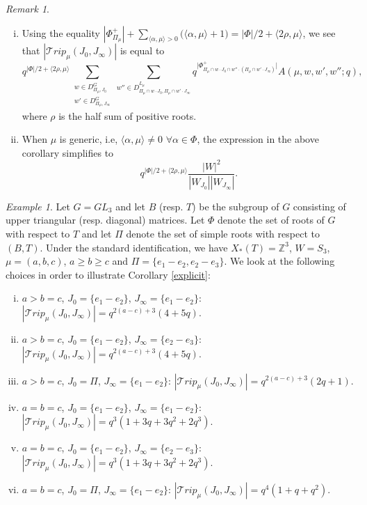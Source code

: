 \documentclass{amsart}
\theoremstyle{plain}
\theoremstyle{definition}
\theoremstyle{remark}
\newtheorem{remark}{Remark}[section]
\newtheorem{example}{Example}
\begin{document}
\begin{remark}
\begin{enumerate}[(i)]
    \item  Using the equality $|\Phi_{\Pi_{\mu}}^{+}|+\sum_{\langle\alpha,\mu\rangle>0}\big(\langle\alpha,\mu\rangle+1\big)=|\Phi|/2+\langle2\rho,\mu\rangle$, we see that $|\mathcal{T}rip_\mu(J_{0},J_{\infty})|$ is equal to
    \[
q^{|\Phi|/2+\langle2\rho,\mu\rangle}\displaystyle\sum_{\substack{w\in D^{G}_{\Pi_{\mu},J_{0}}
\\
w'\in D^{G}_{\Pi_{\mu},J_{\infty}}}}\sum_{w''\in D^{L_{\mu}}_{\Pi_{\mu}\cap w\cdot J_{0},\Pi_{\mu}\cap w'\cdot J_{\infty}}}q^{\big|\Phi_{\Pi_{\mu}\cap w\cdot J_{0}\cap w''\cdot(\Pi_{\mu}\cap w'\cdot J_{\infty})}^{+}\big|}A(\mu,w,w',w'';q),
\]
where $\rho$ is the half sum of positive roots.
\item When $\mu$ is generic, i.e, $\langle\alpha,\mu\rangle\neq 0$ $\forall\alpha\in\Phi$, the expression in the above corollary simplifies to
\[
q^{|\Phi|/2+\langle2\rho,\mu\rangle}\frac{|W|^{2}}{|W_{J_{0}}||W_{J_{\infty}}|}.
\]
\end{enumerate}
\end{remark}
\begin{example}
    Let $G=GL_{3}$ and let $B$ (resp. $T$) be the subgroup of $G$ consisting of upper triangular (resp. diagonal) matrices. Let $\Phi$ denote the set of roots of $G$ with respect to $T$ and let $\Pi$ denote the set of simple roots with respect to $(B,T)$. Under the standard identification, we have $X_{*}(T)=\mathbb{Z}^{3}$, $W=S_{3}$, $\mu=(a,b,c)$, $a\geq b\geq c$ and $\Pi=\{e_{1}-e_{2},e_{2}-e_{3}\}$. We look at the following choices in order to illustrate Corollary \ref{explicit}:
    \begin{enumerate}[(i)]
        \item $a>b=c$, $J_{0}=\{e_{1}-e_{2}\}$, $J_{\infty}=\{e_{1}-e_{2}\}$: $|\mathcal{T}rip_\mu(J_{0},J_{\infty})|=q^{2(a-c)+3}(4+5q)$.
        \item $a>b=c$, $J_{0}=\{e_{1}-e_{2}\}$, $J_{\infty}=\{e_{2}-e_{3}\}$: $|\mathcal{T}rip_\mu(J_{0},J_{\infty})|=q^{2(a-c)+3}(4+5q)$.
        \item $a>b=c$, $J_{0}=\Pi$, $J_{\infty}=\{e_{1}-e_{2}\}$: $|\mathcal{T}rip_\mu(J_{0},J_{\infty})|=q^{2(a-c)+3}(2q+1)$.
        \item $a=b=c$, $J_{0}=\{e_{1}-e_{2}\}$, $J_{\infty}=\{e_{1}-e_{2}\}$: $|\mathcal{T}rip_\mu(J_{0},J_{\infty})|=q^{3}(1+3q+3q^{2}+2q^{3})$.
        \item $a=b=c$, $J_{0}=\{e_{1}-e_{2}\}$, $J_{\infty}=\{e_{2}-e_{3}\}$: $|\mathcal{T}rip_\mu(J_{0},J_{\infty})|=q^{3}(1+3q+3q^{2}+2q^{3})$.
        \item $a=b=c$, $J_{0}=\Pi$, $J_{\infty}=\{e_{1}-e_{2}\}$: $|\mathcal{T}rip_\mu(J_{0},J_{\infty})|=q^{4}(1+q+q^{2})$.
    \end{enumerate}
\end{example}
\end{document}

